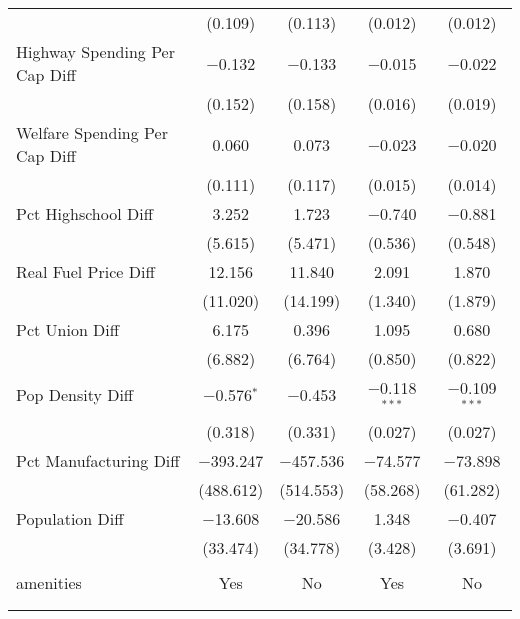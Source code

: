 \begin{table}[!htbp]
\begin{tabular}{@{\extracolsep{5pt}}lcccc}
  & (0.109) & (0.113) & (0.012) & (0.012) \\ 
  Highway Spending Per Cap Diff & $-$0.132 & $-$0.133 & $-$0.015 & $-$0.022 \\ 
  & (0.152) & (0.158) & (0.016) & (0.019) \\ 
  Welfare Spending Per Cap Diff & 0.060 & 0.073 & $-$0.023 & $-$0.020 \\ 
  & (0.111) & (0.117) & (0.015) & (0.014) \\ 
  Pct Highschool Diff & 3.252 & 1.723 & $-$0.740 & $-$0.881 \\ 
  & (5.615) & (5.471) & (0.536) & (0.548) \\ 
  Real Fuel Price Diff & 12.156 & 11.840 & 2.091 & 1.870 \\ 
  & (11.020) & (14.199) & (1.340) & (1.879) \\ 
  Pct Union Diff & 6.175 & 0.396 & 1.095 & 0.680 \\ 
  & (6.882) & (6.764) & (0.850) & (0.822) \\ 
  Pop Density Diff & $-$0.576$^{*}$ & $-$0.453 & $-$0.118$^{***}$ & $-$0.109$^{***}$ \\ 
  & (0.318) & (0.331) & (0.027) & (0.027) \\ 
  Pct Manufacturing Diff & $-$393.247 & $-$457.536 & $-$74.577 & $-$73.898 \\ 
  & (488.612) & (514.553) & (58.268) & (61.282) \\ 
  Population Diff & $-$13.608 & $-$20.586 & 1.348 & $-$0.407 \\ 
  & (33.474) & (34.778) & (3.428) & (3.691) \\ 
 \hline \\[-1.8ex] 
amenities & Yes & No & Yes & No \\ 
\hline \\[-1.8ex] 
\hline 
\hline \\[-1.8ex] 
\end{tabular} 
\end{table} 

